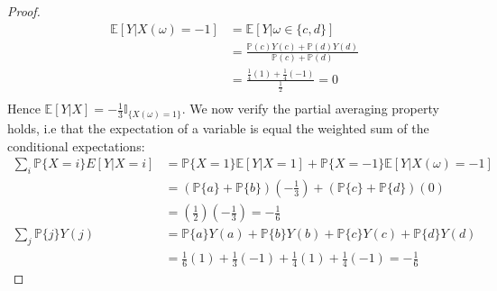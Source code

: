 \documentclass{article}
\newcommand{\p}{\mathbb{P}}
\newcommand{\E}{\mathbb{E}}
\newcommand{\seq}[1]{\{ #1 \}}
\theoremstyle{definition}
\theoremstyle{definition}
\begin{document}
\begin{enumerate}
\begin{enumerate}[(i)]
\begin{proof}
\begin{align*}
              \E[Y|X(\omega)=-1] &= \E[Y| \omega \in \seq{c,d}]  \\
                            & = \frac{\p(c) Y(c) + \p(d) Y(d)}{\p(c)+\p(d)} \\
                            &= \frac{\frac{1}{4} (1) + \frac{1}{4}(-1)}{\frac{1}{2}} = 0 \\ 
        \end{align*}
        Hence $\E[Y|X] = -\frac{1}{3}\mathbb{I}_{\seq{X(\omega)=1}}$. We now verify the partial averaging property holds, i.e that the expectation of a variable is equal the weighted sum of the conditional expectations:
        \begin{align*}
        \sum_{i} \p\seq{X=i}E[Y|X=i] &= \p\seq{X=1}\E[Y|X=1]+\p\seq{X=-1}\E[Y|X(\omega)=-1] \\
        &= (\p\seq{a}+\p\seq{b}) \left( -\frac{1}{3} \right) + (\p\seq{c}+\p\seq{d}) \left( 0\right)  \\
        &= \left( \frac{1}{2} \right) \left( -\frac{1}{3} \right) = -\frac{1}{6} \\
        \sum_j \p\seq{j} Y(j) &=  \p\seq{a}Y(a)+\p\seq{b}Y(b)+\p\seq{c}Y(c)+\p\seq{d}Y(d) \\
        &= \frac{1}{6}(1) + \frac{1}{3}(-1) + \frac{1}{4}(1)+\frac{1}{4}(-1) = -\frac{1}{6}
        \end{align*}
        

\end{proof}
\end{enumerate}
\end{enumerate}
\end{document}
